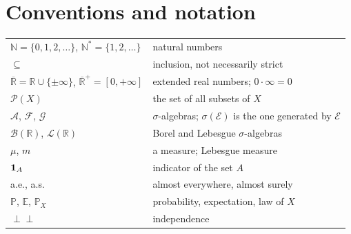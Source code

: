 \section*{Conventions and notation}
\begin{center}
\begin{tabular}{@{}ll@{}}
\toprule
$\mathbb N=\{0,1,2,\dots\}$, $\mathbb N^*=\{1,2,\dots\}$ & natural numbers \\
$\subseteq$ & inclusion, not necessarily strict\\
$\overline{\mathbb R}=\mathbb R\cup\{\pm\infty\}$, $\overline{\mathbb R}^+=[0,+\infty]$ & extended real numbers; $0\cdot\infty=0$\\
$\mathcal P(X)$ & the set of all subsets of $X$\\
$\mathcal A$, $\mathcal F$, $\mathcal G$ & $\sigma$-algebras; $\sigma(\mathcal E)$ is the one generated by $\mathcal E$\\
$\mathcal B(\mathbb R)$, $\mathcal L(\mathbb R)$ & Borel and Lebesgue $\sigma$-algebras\\
$\mu$, $m$ & a measure; Lebesgue measure\\
$\mathbf{1}_A$ & indicator of the set $A$\\
a.e., a.s. & almost everywhere, almost surely\\
$\mathbb P$, $\mathbb E$, $\mathbb P_X$ & probability, expectation, law of $X$\\
$\perp\!\!\!\perp$ & independence\\
\bottomrule
\end{tabular}
\end{center}
